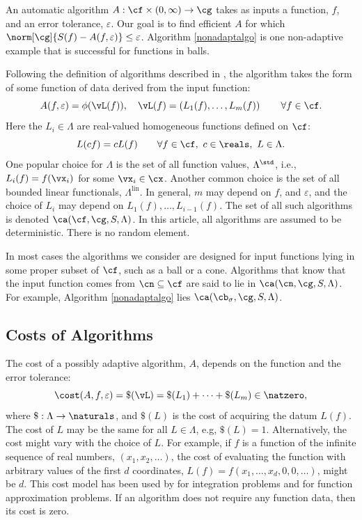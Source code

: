 \documentclass[]{elsarticle}
\DeclareMathOperator{\lin}{lin}
\theoremstyle{definition}
\theoremstyle{remark}
\begin{document}
An automatic algorithm $A:\cf\times(0,\infty) \to \cg$ takes as inputs a function, $f$, and an error tolerance, $\varepsilon$.  Our goal is to find efficient $A$ for which $\norm[\cg]{S(f)-A(f,\varepsilon)}\le \varepsilon$.  Algorithm \ref{nonadaptalgo} is one non-adaptive example that is successful for functions in balls.

Following the definition of algorithms described in \cite[Section 3.2]{TraWasWoz88}, the algorithm takes the form of some function of data derived from the input function:
\begin{equation}
\label{algoform}
A(f,\varepsilon) =  \phi(\vL(f)), \quad \vL(f) = \left(L_1(f), \ldots, L_m(f)\right) \qquad \forall f \in \cf.
\end{equation}
Here the $L_i \in \Lambda$ are real-valued homogeneous functions defined on $\cf$:
\begin{equation}
\label{dataassump}
L(cf) = cL(f) \qquad \forall f \in \cf, \ c \in \reals, \ L \in \Lambda.
\end{equation}
One popular choice for $\Lambda$ is the set of all function values, $\Lambda^{\std}$, i.e., $L_i(f) = f(\vx_i)$ for some $\vx_i \in \cx$.  Another common choice is the set of all bounded linear functionals, $\Lambda^{\lin}$.  In general, $m$ may depend on $f$, and $\varepsilon$, and the choice of $L_i$ may depend on $L_1(f), \ldots, L_{i-1}(f)$.  The set of all such algorithms is denoted $\ca(\cf,\cg,S,\Lambda)$. In this article, all algorithms are assumed to be deterministic.  There is no random element.

In most cases the algorithms we consider are designed for input functions lying in some proper subset of $\cf$, such as a ball or a cone.  Algorithms that know that the input function comes from $\cn \subseteq \cf$ are said to lie in $\ca(\cn,\cg,S,\Lambda)$. For example, Algorithm \ref{nonadaptalgo} lies $\ca(\cb_{\sigma},\cg,S,\Lambda)$.  

\subsection{Costs of Algorithms} \label{AlgoCostsec}

The cost of a possibly adaptive algorithm, $A$, depends on the function and the error tolerance: 
\[
\cost(A,f,\varepsilon) = \$(\vL) = \$(L_1) + \cdots +\$(L_m) \in \natzero,
\]
where $\$:\Lambda \to \naturals$, and $\$(L)$ is the cost of acquiring the datum $L(f)$. The cost of $L$ may be the same for all $L \in \Lambda$, e.g, $\$(L)=1$.  Alternatively, the cost might vary with the choice of $L$.  For example, if $f$ is a function of the infinite sequence of real numbers, $(x_1, x_2, \ldots)$, the cost of evaluating the function with arbitrary values of the first $d$ coordinates, $L(f)=f(x_1, \ldots, x_d, 0, 0, \ldots)$, might be $d$.  This cost model has been used by \cite{HicMGRitNiu09a,KuoEtal10a,NiuHic09a,NiuHic09b,PlaWas11a} for integration problems and \cite{Was13a,WasWoz11a,WasWoz11b} for function approximation problems.  If an algorithm does not require any function data, then its cost is zero.
\end{document}
